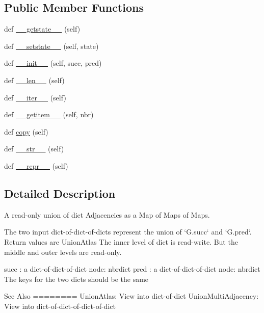 \subsection*{Public Member Functions}
\begin{DoxyCompactItemize}
\item 
def \hyperlink{classnetworkx_1_1classes_1_1coreviews_1_1UnionAdjacency_a55a583f7316f2ca79aeb4048e8a8cea2}{\+\_\+\+\_\+getstate\+\_\+\+\_\+} (self)
\item 
def \hyperlink{classnetworkx_1_1classes_1_1coreviews_1_1UnionAdjacency_a4e528f035648e755cc55105aa6bde672}{\+\_\+\+\_\+setstate\+\_\+\+\_\+} (self, state)
\item 
def \hyperlink{classnetworkx_1_1classes_1_1coreviews_1_1UnionAdjacency_a3c5908ecd17e6717f141eb1531d4b548}{\+\_\+\+\_\+init\+\_\+\+\_\+} (self, succ, pred)
\item 
def \hyperlink{classnetworkx_1_1classes_1_1coreviews_1_1UnionAdjacency_ac181acdcc8aa1335f9d897f673009f41}{\+\_\+\+\_\+len\+\_\+\+\_\+} (self)
\item 
def \hyperlink{classnetworkx_1_1classes_1_1coreviews_1_1UnionAdjacency_ae57da836bc2592c648f65633e1c1b697}{\+\_\+\+\_\+iter\+\_\+\+\_\+} (self)
\item 
def \hyperlink{classnetworkx_1_1classes_1_1coreviews_1_1UnionAdjacency_a2fda7ec7297c29c4fcd7e17e2caa24f0}{\+\_\+\+\_\+getitem\+\_\+\+\_\+} (self, nbr)
\item 
def \hyperlink{classnetworkx_1_1classes_1_1coreviews_1_1UnionAdjacency_aeb3f916334c30c45c915b4835da08c01}{copy} (self)
\item 
def \hyperlink{classnetworkx_1_1classes_1_1coreviews_1_1UnionAdjacency_ab09a92b81d346d060d735eb91a925c24}{\+\_\+\+\_\+str\+\_\+\+\_\+} (self)
\item 
def \hyperlink{classnetworkx_1_1classes_1_1coreviews_1_1UnionAdjacency_a1de445d01f087cb8fbb2af67a80b7074}{\+\_\+\+\_\+repr\+\_\+\+\_\+} (self)
\end{DoxyCompactItemize}


\subsection{Detailed Description}
\begin{DoxyVerb}A read-only union of dict Adjacencies as a Map of Maps of Maps.

The two input dict-of-dict-of-dicts represent the union of
`G.succ` and `G.pred`. Return values are UnionAtlas
The inner level of dict is read-write. But the
middle and outer levels are read-only.

succ : a dict-of-dict-of-dict {node: nbrdict}
pred : a dict-of-dict-of-dict {node: nbrdict}
The keys for the two dicts should be the same

See Also
========
UnionAtlas: View into dict-of-dict
UnionMultiAdjacency: View into dict-of-dict-of-dict-of-dict
\end{DoxyVerb}
 

